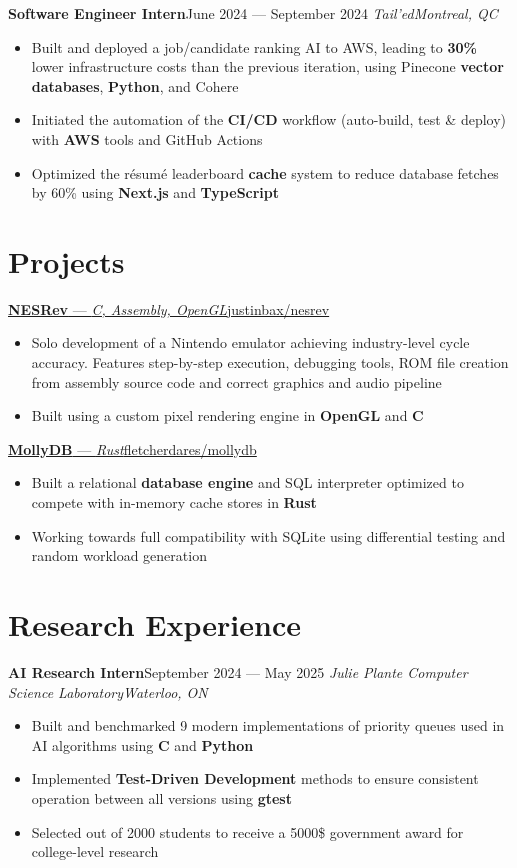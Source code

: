 \documentclass{article}
\newcommand{\newrole}[4]{
    {\normalfont\textbf{#1}\hfill#3}
    \newline
    \textit{#2}\hfill\textit{#4}
}
\newcommand{\shortlinkrole}[4]{
    {\href{#3}{\normalfont\textbf{#1} --- \textit{#2}\hfill#4\:\faExternalLink}\vspace*{-4pt}}
}
\newenvironment{bulletpoints}{\begin{itemize}\setlength\itemsep{-0.2em}}{\end{itemize}}
\begin{document}
\newrole{Software Engineer Intern}{Tail'ed}{June 2024 --- September 2024}{Montreal, QC}
\begin{bulletpoints}
    \item Built and deployed a job/candidate ranking AI to AWS, leading to \textbf{30\%} lower infrastructure costs than the previous iteration, using Pinecone \textbf{vector databases}, \textbf{Python}, and Cohere
    \item Initiated the automation of the \textbf{CI/CD} workflow (auto-build, test \& deploy) with \textbf{AWS} tools and GitHub Actions
    \item Optimized the résumé leaderboard \textbf{cache} system to reduce database fetches by 60\% using \textbf{Next.js} and \textbf{TypeScript}
\end{bulletpoints}


\section*{Projects}

\shortlinkrole{NESRev}{C, Assembly, OpenGL}{https://github.com/justinbax/nesrev}{justinbax/nesrev}
\begin{bulletpoints}
    \item Solo development of a Nintendo emulator achieving industry-level cycle accuracy. Features step-by-step execution, debugging tools, ROM file creation from assembly source code and correct graphics and audio pipeline
    \item Built using a custom pixel rendering engine in \textbf{OpenGL} and \textbf{C}
\end{bulletpoints}

\shortlinkrole{MollyDB}{Rust}{https://github.com/FletcherDares/mollydb}{fletcherdares/mollydb}
\begin{bulletpoints}
    \item Built a relational \textbf{database engine} and SQL interpreter optimized to compete with in-memory cache stores in \textbf{Rust}
    \item Working towards full compatibility with SQLite using differential testing and random workload generation
\end{bulletpoints}


\section*{Research Experience}
\newrole{AI Research Intern}{Julie Plante Computer Science Laboratory}{September 2024 --- May 2025}{Waterloo, ON}
\begin{bulletpoints}
    \item Built and benchmarked 9 modern implementations of priority queues used in AI algorithms using \textbf{C} and \textbf{Python}
    \item Implemented \textbf{Test-Driven Development} methods to ensure consistent operation between all versions using \textbf{gtest}
    \item Selected out of 2000 students to receive a 5000\$ government award for college-level research
\end{bulletpoints}
\end{document}
